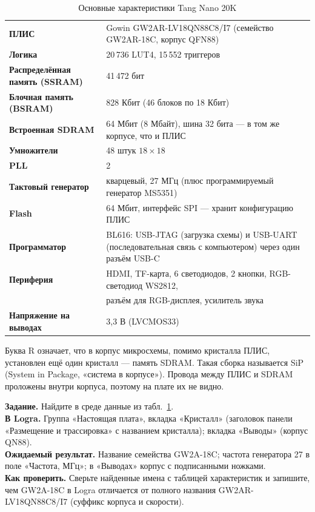 \begin{table}[H]
\centering
\caption{Основные характеристики Tang Nano 20K}
\label{tab:specs}
\small
\begin{tabularx}{0.95\textwidth}{>{\bfseries}l X}
\toprule
ПЛИС                 & Gowin GW2AR-LV18QN88C8/I7 (семейство GW2AR-18C, корпус QFN88) \\
Логика               & 20\,736 LUT4, 15\,552 триггеров \\
Распределённая память (SSRAM) & 41\,472 бит \\
Блочная память (BSRAM) & 828 Кбит (46 блоков по 18 Кбит) \\
Встроенная SDRAM     & 64 Мбит (8 Мбайт), шина 32 бита --- в том же корпусе, что и ПЛИС \\
Умножители           & 48 штук $18\times18$ \\
PLL                  & 2 \\
Тактовый генератор   & кварцевый, 27 МГц (плюс программируемый генератор MS5351) \\
Flash                & 64 Мбит, интерфейс SPI --- хранит конфигурацию ПЛИС \\
Программатор         & BL616: USB-JTAG (загрузка схемы) и USB-UART (последовательная связь с компьютером) через один разъём USB-C \\
Периферия            & HDMI, TF-карта, 6 светодиодов, 2 кнопки, RGB-светодиод WS2812, \\
                     & разъём для RGB-дисплея, усилитель звука \\
Напряжение на выводах & 3,3 В (LVCMOS33) \\
\bottomrule
\end{tabularx}
\end{table}

\begin{infobox}
Буква R означает, что в корпус микросхемы, помимо кристалла ПЛИС, установлен ещё
один кристалл --- память SDRAM. Такая сборка называется SiP
(System in Package, «система в корпусе»). Провода между ПЛИС и SDRAM проложены
внутри корпуса, поэтому на плате их не видно.
\end{infobox}

\begin{diybox}
\textbf{Задание.} Найдите в среде данные из табл.~\ref{tab:specs}.\\
\textbf{В Logra.} Группа «Настоящая плата», вкладка «Кристалл» (заголовок панели «Размещение и трассировка» с названием кристалла); вкладка «Выводы» (корпус QN88).\\
\textbf{Ожидаемый результат.} Название семейства GW2A-18C; частота генератора 27 в поле «Частота, МГц»; в «Выводах» корпус с подписанными ножками.\\
\textbf{Как проверить.} Сверьте найденные имена с таблицей характеристик и запишите, чем GW2A-18C в Logra отличается от полного названия GW2AR-LV18QN88C8/I7 (суффикс корпуса и скорости).
\end{diybox}

